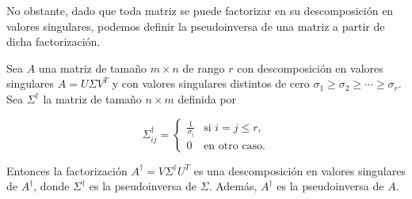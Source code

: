No obstante, dado que toda matriz se puede factorizar en su descomposición en valores singulares, podemos definir la pseudoinversa de una matriz a partir de dicha factorización.
\begin{definicion}
    Sea $A$ una matriz de tamaño $m \times n$ de rango $r$ con descomposición en valores singulares $A = U \Sigma V^{T}$ y con valores singulares distintos de cero $\sigma_{1} \geq \sigma_{2} \geq \cdots \geq \sigma_{r}$. Sea $\Sigma^{\dagger}$ la matriz de tamaño $n \times m$ definida por

    \[
        \Sigma^{\dagger}_{ij} =
        \begin{cases}
            \frac{1}{\sigma_i} & \text{si } i = j \leq r, \\
            0 & \text{en otro caso.}
        \end{cases}
    \]

    Entonces la factorización $A^{\dagger} = V \Sigma^{\dagger} U^{T}$ es una descomposición en valores singulares de $A^{\dagger}$, donde $\Sigma^{\dagger}$ es la pseudoinversa de $\Sigma$. Además, $A^{\dagger}$ es la pseudoinversa de $A$.
\end{definicion}

